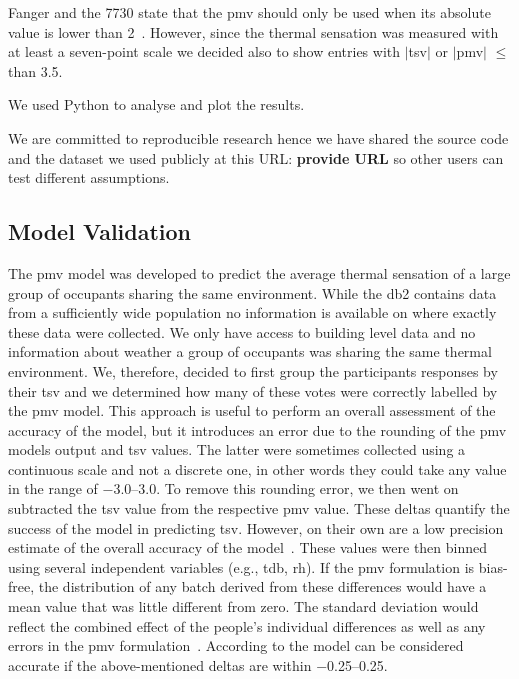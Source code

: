 Fanger and the \gls{7730} state that the \ac{pmv} should only be used when its absolute value is lower than 2~\cite{Fanger1970, iso7730}.
However, since the thermal sensation was measured with at least a seven-point scale we decided also to show entries with $|$\ac{tsv}$|$ or $|$\ac{pmv}$|$ $\leq$ than \num{3.5}.

We used Python to analyse and plot the results.

We are committed to reproducible research hence we have shared the source code and the dataset we used publicly at this URL: \textbf{provide URL} so other users can test different assumptions.  %

\subsection{Model Validation}\label{subsec:model-validation}
The \ac{pmv} model was developed to predict the average thermal sensation of a large group of occupants sharing the same environment.
While the \gls{db2} contains data from a sufficiently wide population no information is available on where exactly these data were collected.
We only have access to building level data and no information about weather a group of occupants was sharing the same thermal environment.
We, therefore, decided to first group the participants responses by their \ac{tsv} and we determined how many of these votes were correctly labelled by the \ac{pmv} model.
This approach is useful to perform an overall assessment of the accuracy of the model, but it introduces an error due to the rounding of the \ac{pmv} models output and \ac{tsv} values.
The latter were sometimes collected using a continuous scale and not a discrete one, in other words they could take any value in the range of \numrange{-3.0}{3.0}.
To remove this rounding error, we then went on subtracted the \ac{tsv} value from the respective \ac{pmv} value.
These deltas quantify the success of the model in predicting \ac{tsv}.
However, on their own are a low precision estimate of the overall accuracy of the model~\cite{Humphreys2002}.
These values were then binned using several independent variables (e.g., \ac{tdb}, \ac{rh}).
If the \ac{pmv} formulation is bias-free, the distribution of any batch derived from these differences would have a mean value that was little different from zero.
The standard deviation would reflect the combined effect of the people's individual differences as well as any errors in the \ac{pmv} formulation~\cite{Humphreys2002}.
According to  the model can be considered accurate if the above-mentioned deltas are within \numrange{-0.25}{0.25}.

